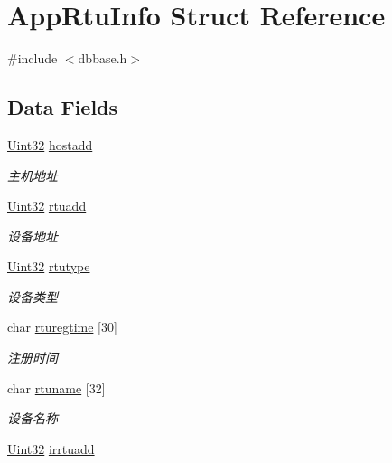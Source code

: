 \hypertarget{structAppRtuInfo}{\section{App\-Rtu\-Info Struct Reference}
\label{structAppRtuInfo}
}


{\ttfamily \#include $<$dbbase.\-h$>$}

\subsection*{Data Fields}
\begin{DoxyCompactItemize}
\item 
\hyperlink{base_8h_a60cf7b3c038ce37a50796e8eaddf0b5f}{Uint32} \hyperlink{structAppRtuInfo_a15bdb2e241557f3f7326f35e1599568a}{hostadd}
\begin{DoxyCompactList}\small\item\em 主机地址 \end{DoxyCompactList}\item 
\hyperlink{base_8h_a60cf7b3c038ce37a50796e8eaddf0b5f}{Uint32} \hyperlink{structAppRtuInfo_acbf93c9e6fd07ac0a29f9596d9e59225}{rtuadd}
\begin{DoxyCompactList}\small\item\em 设备地址 \end{DoxyCompactList}\item 
\hyperlink{base_8h_a60cf7b3c038ce37a50796e8eaddf0b5f}{Uint32} \hyperlink{structAppRtuInfo_ac1276ea402781dd4b37db5a8e42cc4ed}{rtutype}
\begin{DoxyCompactList}\small\item\em 设备类型 \end{DoxyCompactList}\item 
char \hyperlink{structAppRtuInfo_af67db23fe4859da9266c4de6e0ae0a0f}{rturegtime} \mbox{[}30\mbox{]}
\begin{DoxyCompactList}\small\item\em 注册时间 \end{DoxyCompactList}\item 
char \hyperlink{structAppRtuInfo_a55eac142ebeb6bb83b34eb6aaf075991}{rtuname} \mbox{[}32\mbox{]}
\begin{DoxyCompactList}\small\item\em 设备名称 \end{DoxyCompactList}\item 
\hyperlink{base_8h_a60cf7b3c038ce37a50796e8eaddf0b5f}{Uint32} \hyperlink{structAppRtuInfo_a8b72cfd3f9a68f1350484b373da647ab}{irrtuadd}

\end{DoxyCompactItemize}
